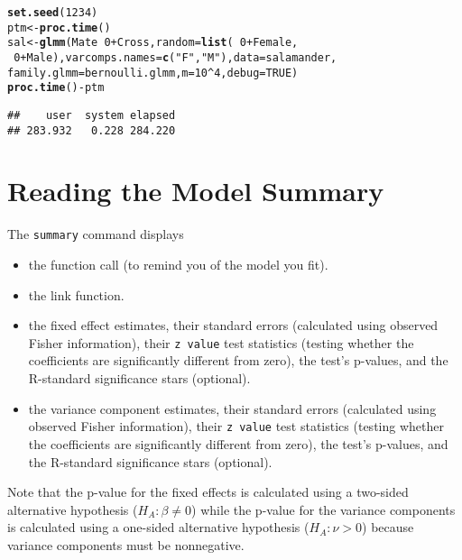 \documentclass[11pt]{article}\usepackage[]{graphicx}\usepackage[]{color}
\makeatletter
\newcommand{\hlnum}[1]{\textcolor[rgb]{0.686,0.059,0.569}{#1}}%
\newcommand{\hlstr}[1]{\textcolor[rgb]{0.192,0.494,0.8}{#1}}%
\newcommand{\hlopt}[1]{\textcolor[rgb]{0,0,0}{#1}}%
\newcommand{\hlstd}[1]{\textcolor[rgb]{0.345,0.345,0.345}{#1}}%
\newcommand{\hlkwb}[1]{\textcolor[rgb]{0.69,0.353,0.396}{#1}}%
\newcommand{\hlkwc}[1]{\textcolor[rgb]{0.333,0.667,0.333}{#1}}%
\newcommand{\hlkwd}[1]{\textcolor[rgb]{0.737,0.353,0.396}{\textbf{#1}}}%
\newenvironment{kframe}{%
 \def\at@end@of@kframe{}%
 \ifinner\ifhmode%
  \def\at@end@of@kframe{\end{minipage}}%
  \begin{minipage}{\columnwidth}%
 \fi\fi%
 \def\FrameCommand##1{\hskip\@totalleftmargin \hskip-\fboxsep
 \colorbox{shadecolor}{##1}\hskip-\fboxsep
     \hskip-\linewidth \hskip-\@totalleftmargin \hskip\columnwidth}%
 \MakeFramed {\advance\hsize-\width
   \@totalleftmargin\z@ \linewidth\hsize
   \@setminipage}}%
 {\par\unskip\endMakeFramed%
 \at@end@of@kframe}
\newenvironment{knitrout}{}{} %
\makeatother
\begin{document}
\begin{knitrout}
\color{fgcolor}\begin{kframe}
\begin{alltt}
\hlkwd{set.seed}\hlstd{(}\hlnum{1234}\hlstd{)}
\hlstd{ptm}\hlkwb{<-}\hlkwd{proc.time}\hlstd{()}
\hlstd{sal} \hlkwb{<-} \hlkwd{glmm}\hlstd{(Mate} \hlopt{~} \hlnum{0} \hlopt{+} \hlstd{Cross,} \hlkwc{random} \hlstd{=} \hlkwd{list}\hlstd{(}\hlopt{~} \hlnum{0} \hlopt{+} \hlstd{Female,}
\hlopt{~} \hlnum{0} \hlopt{+} \hlstd{Male),} \hlkwc{varcomps.names} \hlstd{=} \hlkwd{c}\hlstd{(}\hlstr{"F"}\hlstd{,} \hlstr{"M"}\hlstd{),} \hlkwc{data} \hlstd{= salamander,}
\hlkwc{family.glmm} \hlstd{= bernoulli.glmm,} \hlkwc{m} \hlstd{=} \hlnum{10}\hlopt{^}\hlnum{4}\hlstd{,} \hlkwc{debug} \hlstd{=} \hlnum{TRUE}\hlstd{)}
\hlkwd{proc.time}\hlstd{()} \hlopt{-} \hlstd{ptm}
\end{alltt}
\begin{verbatim}
##    user  system elapsed 
## 283.932   0.228 284.220
\end{verbatim}
\end{kframe}
\end{knitrout}


\section{Reading the Model Summary}\label{sec:summary}

The \texttt{summary} command displays
\begin{itemize}
\item the function call (to remind you of the model you fit).
\item the link function.
\item the fixed effect estimates, their standard errors (calculated using observed Fisher information), their \texttt{z value} test statistics (testing whether the coefficients are significantly different from zero), the test's p-values, and the R-standard significance stars (optional).
\item the variance component estimates, their standard errors (calculated using observed Fisher information), their \texttt{z value} test statistics (testing whether the coefficients are significantly different from zero), the test's p-values, and the R-standard significance stars (optional).
\end{itemize}



Note that the p-value for the fixed effects is calculated using a two-sided alternative hypothesis ($H_A: \beta \neq 0$) while the p-value for the variance components is calculated using a one-sided alternative hypothesis ($H_A: \nu >0$) because variance components must be nonnegative.\\
\end{document}
